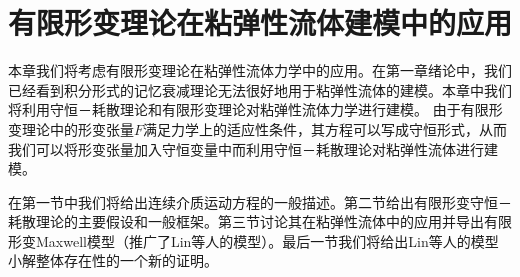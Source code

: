 \chapter{有限形变理论在粘弹性流体建模中的应用}


% 
本章我们将考虑有限形变理论在粘弹性流体力学中的应用。在第一章绪论中，我们已经看到积分形式的记忆衰减理论无法很好地用于粘弹性流体的建模。本章中我们将利用守恒－耗散理论和有限形变理论对粘弹性流体力学进行建模。
由于有限形变理论中的形变张量$F$满足力学上的适应性条件，其方程可以写成守恒形式，从而我们可以将形变张量加入守恒变量中而利用守恒－耗散理论对粘弹性流体进行建模。

在第一节中我们将给出连续介质运动方程的一般描述。第二节给出有限形变守恒－耗散理论的主要假设和一般框架。第三节讨论其在粘弹性流体中的应用并导出有限形变Maxwell模型（推广了Lin等人的模型）。最后一节我们将给出Lin等人的模型小解整体存在性的一个新的证明。

